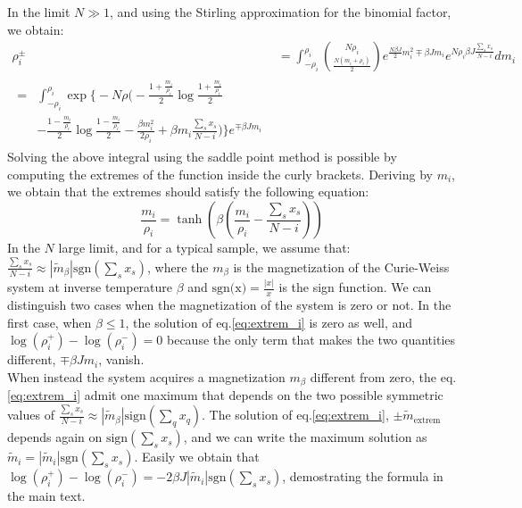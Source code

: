 \documentclass[10pt, notitlepage]{revtex4-2}
\begin{document}
In the limit $N \gg 1$, and using the Stirling approximation for the binomial factor, we obtain:
 \begin{align}
 \rho_i^{\pm} & = 
  \int_{-\rho_i}^{\rho_i} \binom{N\rho_i}{\frac{N(m_i+\rho_i)}{2}} e^{\frac{N \beta J}{2}m_i^{2} \mp \beta J m_i } e^{N \rho_i \beta J \frac{\sum_s x_s}{N-i}} dm_i \\
\begin{split} 
  = & \int_{-\rho_i}^{\rho_i} \exp\bigg\{-N\rho\big( -\frac{1+\frac{m_i}{\rho_i}}{2} \log\frac{1+\frac{m_i}{\rho_i}}{2} \\
   & - \frac{1-\frac{m_i}{\rho_i}}{2} \log\frac{1-\frac{m_i}{\rho_i}}{2} 
      - \frac{\beta m_i^2}{2 \rho_i} + \beta m_i \frac{\sum_s x_s}{N-i}\big) \bigg\} e^{\mp \beta J m_i}
\end{split}
\end{align}
Solving the above integral using the saddle point method is possible by computing the extremes of the function inside the curly brackets. Deriving by $m_i$, we obtain that the extremes should satisfy the following equation:
\begin{equation}
\frac{m_i}{\rho_i} = \tanh \left( \beta(\frac{m_i}{\rho_i} - \frac{\sum_s x_s}{N-i}) \right)
\label{eq:extrem_i}
\end{equation}
In the $N$ large limit, and for a typical sample, we assume that: $\frac{\sum_s x_s}{N-i} \approx |\tilde{m}_{\beta}| \text{sgn}(\sum_s x_s)$, where the $m_{\beta}$ is the magnetization of the Curie-Weiss system at inverse temperature $\beta$ and $\text{sgn(x)} = \frac{|x|}{x}$ is the sign function.
We can distinguish two cases when the magnetization of the system is zero or not. 
In the first case, when $\beta\leq 1$, the solution of eq.\ref{eq:extrem_i} is zero as well, and $\log(\rho_i^{+}) - \log(\rho_i^{-})=0$ because the only term that makes the two quantities different, $\mp \beta J m_i$, vanish.\\ 
When instead the system acquires a magnetization $m_{\beta}$ different from zero, the eq.\ref{eq:extrem_i} admit one maximum that depends on the two possible symmetric values of $\frac{\sum_s x_s}{N-i}\approx |\tilde{m}_{\beta}| \text{sign}(\sum_q x_q)$. 
The solution of eq.\ref{eq:extrem_i}, $\pm \tilde{m}_{\text{extrem}}$ depends again on $\text{sign}(\sum_s x_s)$, and we can write the maximum solution as $\tilde{m}_{i}=|\tilde{m}_i| \text{sgn}(\sum_s x_s)$. 
Easily we obtain that $\log(\rho_i^{+}) - \log(\rho_i^{-}) = -2\beta J|\tilde{m}_i| \text{sgn}(\sum_s x_s)$, demostrating the formula in the main text.
\end{document}
